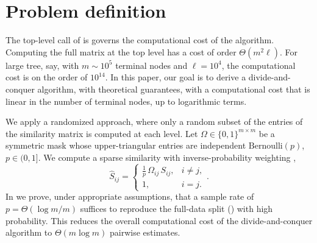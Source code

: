 \section{Problem definition}\label{sec:problem}

The top-level call of  is governs the computational cost of the algorithm. %
Computing the full matrix at the top level has a cost of order $\Theta(m^2\ell)$. For large tree, say, with %
$m \sim 10^5$ terminal nodes and $\ell = 10^4$, the computational cost is on the order of $10^{14}$. 
In this paper, our goal is to derive a divide-and-conquer algorithm, with theoretical guarantees, with a computational cost that is linear in the number of terminal nodes, up to logarithmic terms. 
%

We apply a randomized approach, where only a random subset of the entries of the similarity matrix is computed at each level. 
Let $\Omega\in\{0,1\}^{m\times m}$ be a symmetric mask whose upper-triangular entries are
independent $\mathrm{Bernoulli}(p)$, $p\in(0,1]$. We compute a sparse similarity with
inverse-probability weighting \cite{candes2009matrix},
\begin{equation}\label{eq:sampling_estimator}
   \hat S_{ij}=\begin{cases}\tfrac1p\,\Omega_{ij}\,S_{ij}, & i\ne j,\\ 1, & i=j.\end{cases}.
\end{equation}
In  we prove, under appropriate assumptions, that a sample rate of $p=\Theta(\log m/m)$ suffices to reproduce the full-data split () with high probability. This reduces the overall computational cost of the divide-and-conquer algorithm to 
$\Theta(m\log m)$ pairwise estimates.

